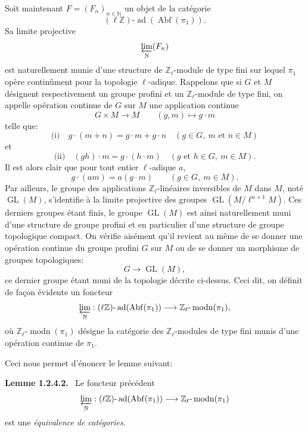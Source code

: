 \documentclass[11pt]{article}
\newenvironment{statement}[1]{\par\medskip\noindent\textbf{#1.}\ }{\par\medskip}
\providecommand{\Abf}{\operatorname{Abf}}
\providecommand{\GL}{\operatorname{GL}}
\providecommand{\ad}{\operatorname{ad}}
\begin{document}
Soit maintenant \(F=(F_n)_{n\in\mathbb N}\) un objet de la catégorie
\[
(\ell\mathbb Z)\text{-}\ad(\Abf(\pi_1)).
\]
Sa limite projective
\[
\varprojlim_{\mathbb N}(F_n)
\]
est naturellement munie d'une structure de \(\mathbb Z_\ell\)-module de type fini sur lequel \(\pi_1\) opère continûment pour la topologie \(\ell\)-adique. Rappelons que si \(G\) et \(M\) désignent respectivement un groupe profini et un \(\mathbb Z_\ell\)-module de type fini, on appelle opération continue de \(G\) sur \(M\) une application continue
\[
G\times M\longrightarrow M\qquad (g,m)\longmapsto g\cdot m
\]
telle que:
\[
\text{(i)}\quad g\cdot(m+n)=g\cdot m+g\cdot n\quad (g\in G,\ m\text{ et }n\in M)
\]
et
\[
\text{(ii)}\quad (gh)\cdot m=g\cdot(h\cdot m)\quad (g\text{ et }h\in G,\ m\in M).
\]
Il est alors clair que pour tout entier \(\ell\)-adique \(a\),
\[
g\cdot(am)=a(g\cdot m)\qquad (g\in G,\ m\in M).
\]
Par ailleurs, le groupe des applications \(\mathbb Z_\ell\)-linéaires inversibles de \(M\) dans \(M\), noté \(\GL(M)\), s'identifie à la limite projective des groupes 
\(\GL(M/\ell^{n+1}M)\). Ces
derniers groupes étant finis, le groupe \(\GL(M)\) est ainsi naturellement muni d'une structure de groupe profini et en particulier d'une structure de groupe topologique compact. On vérifie aisément qu'il revient au même de se donner une opération continue du groupe profini \(G\) sur \(M\) ou de se donner un morphisme de groupes topologiques:
\[
G\longrightarrow \GL(M),
\]
ce dernier groupe étant muni de la topologie décrite ci-dessus. Ceci dit, on définit de façon évidente un foncteur
\[
\varprojlim_{\mathbb N}:(\ell\mathbb Z)\text{-}\ad(\Abf(\pi_1))\longrightarrow
\mathbb Z_\ell\text{-}\operatorname{modn}(\pi_1),
\]
où \(\mathbb Z_\ell\text{-}\operatorname{modn}(\pi_1)\) désigne la catégorie des \(\mathbb Z_\ell\)-modules de type fini munis d'une opération continue de \(\pi_1\).

Ceci nous permet d'énoncer le lemme suivant:

\begin{statement}{Lemme 1.2.4.2}
Le foncteur précédent
\[
\varprojlim_{\mathbb N}:(\ell\mathbb Z)\text{-}\ad(\Abf(\pi_1))
\longrightarrow \mathbb Z_\ell\text{-}\operatorname{modn}(\pi_1)
\]
est une \emph{équivalence de catégories}.
\end{statement}
\end{document}
